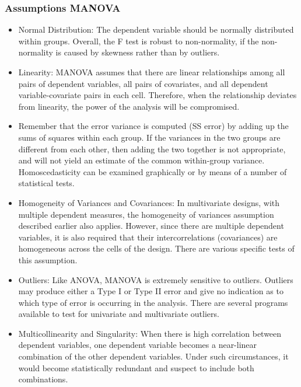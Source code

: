 \begin{frame}[allowframebreaks]\frametitle{Assumptions MANOVA}
  \begin{itemize}
  \item Normal Distribution: The dependent variable should be normally distributed within groups.  Overall, the F test is robust to non-normality, if the non-normality is caused by skewness rather than by outliers.
  \item Linearity: MANOVA assumes that there are linear relationships among all pairs of dependent variables, all pairs of covariates, and all dependent variable-covariate pairs in each cell.  Therefore, when the relationship deviates from linearity, the power of the analysis will be compromised.
  \item Remember that the error variance is computed (SS error) by adding up the sums of squares within each group. If the variances in the two groups are different from each other, then adding the two together is not appropriate, and will not yield an estimate of the common within-group variance.  Homoscedasticity can be examined graphically or by means of a number of statistical tests.
  \item Homogeneity of Variances and Covariances: In multivariate designs, with multiple dependent measures, the homogeneity of variances assumption described earlier also applies. However, since there are multiple dependent variables, it is also required that their intercorrelations (covariances) are homogeneous across the cells of the design. There are various specific tests of this assumption.
  \item Outliers: Like ANOVA, MANOVA is extremely sensitive to outliers.  Outliers may produce either a Type I or Type II error and give no indication as to which type of error is occurring in the analysis.  There are several programs available to test for univariate and multivariate outliers.
  \item Multicollinearity and Singularity: When there is high correlation between dependent variables, one dependent variable becomes a near-linear combination of the other dependent variables.  Under such circumstances, it would become statistically redundant and suspect to include both combinations.
  \end{itemize}
\end{frame}



